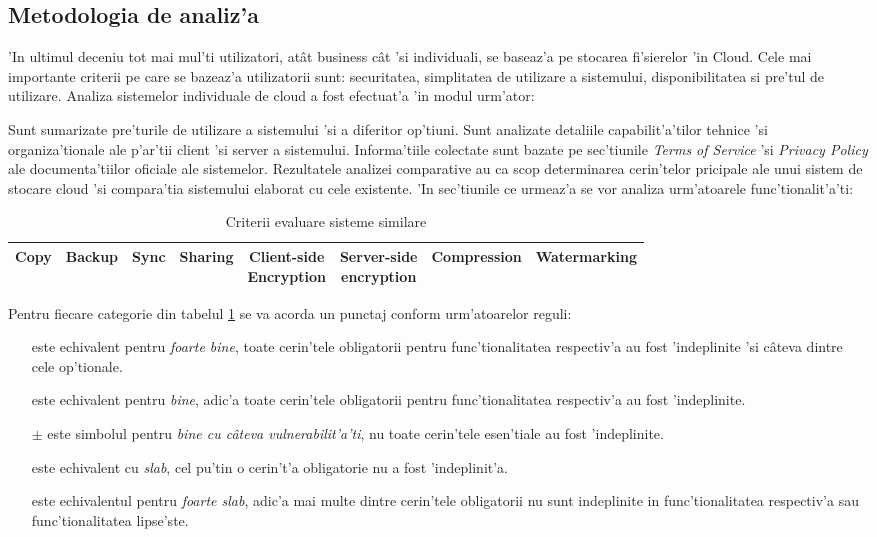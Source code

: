 \documentclass[12pt,a4paper,twoside]{report}
\newcommand{\greencheck}{\color{green}  \ding{51}}
\newcommand{\orangepm}{\color{orange} \textbf{$\pm$}}
\newcommand{\redxmark}{\color{red} \ding{55}}
\begin{document}
\subsection{Metodologia de analiz'a}
'In ultimul deceniu tot mai mul'ti utilizatori, atât business cât 'si individuali, se baseaz'a pe stocarea fi'sierelor 'in Cloud.  Cele mai importante criterii pe care se bazeaz'a utilizatorii sunt: securitatea, simplitatea de utilizare a sistemului, disponibilitatea si pre'tul de utilizare. Analiza sistemelor individuale de cloud a fost efectuat'a 'in modul urm'ator:

Sunt sumarizate pre'turile de utilizare a sistemului 'si a diferitor op'tiuni. Sunt analizate detaliile capabilit'a'tilor tehnice 'si organiza'tionale ale p'ar'tii client 'si server a sistemului. Informa'tiile colectate sunt bazate pe sec'tiunile
{\it Terms of Service } 'si {\it Privacy Policy} ale documenta'tiilor oficiale ale sistemelor\cite{cloudstoragecomparison}.
Rezultatele analizei comparative au ca scop determinarea cerin'telor pricipale ale unui sistem de stocare cloud 'si compara'tia sistemului elaborat cu cele existente.
'In sec'tiunile ce urmeaz'a se vor analiza urm'atoarele func'tionalit'a'ti:

\begin{table}[H]
\caption{Criterii evaluare sisteme similare}
\small
\begin{tabular}{|c|c|c|c|c|c|c|c|}   
       
\hline                     
Copy & Backup & Sync & Sharing & \makecell{Client-side \\ Encryption} & \makecell{ Server-side \\ encryption} & Compression & Watermarking  \\ [0.1ex]   
\hline                              
\end{tabular}
\label{table:criteriatable}             
\end{table}

Pentru fiecare categorie din tabelul \ref{table:criteriatable} se va acorda un punctaj conform urm'atoarelor reguli:

\begin{itemize}
\item[\greencheck\greencheck] este echivalent pentru {\it foarte bine}, toate cerin'tele obligatorii pentru func'tionalitatea respectiv'a au fost 'indeplinite 'si câteva dintre cele op'tionale.
\item[\greencheck] este echivalent pentru {\it bine}, adic'a toate cerin'tele obligatorii pentru func'tionalitatea respectiv'a au fost 'indeplinite.
\item[\orangepm] este simbolul pentru {\it bine cu câteva vulnerabilit'a'ti}, nu toate cerin'tele esen'tiale au fost 'indeplinite.
\item[\redxmark] este echivalent cu {\it slab}, cel pu'tin o cerin't'a obligatorie nu a fost 'indeplinit'a.
\item[\redxmark \redxmark] este echivalentul pentru {\it foarte slab}, adic'a mai multe dintre cerin'tele obligatorii nu sunt indeplinite in func'tionalitatea respectiv'a sau func'tionalitatea lipse'ste.
\end{itemize}
\end{document}
